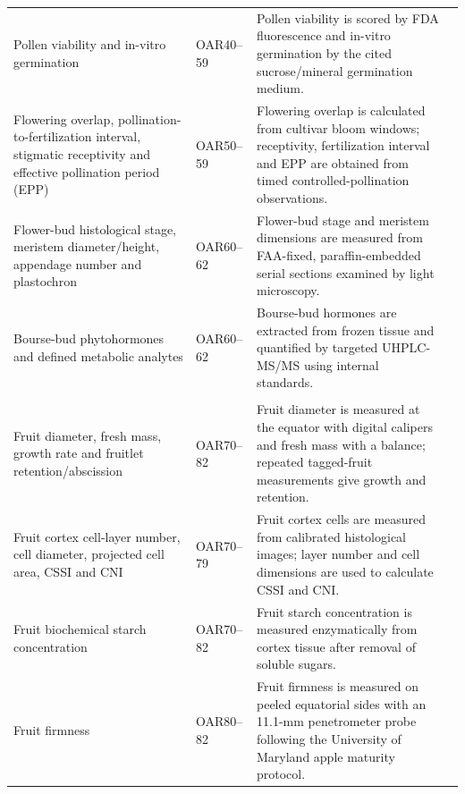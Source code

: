 \begin{landscape}
\begin{longtable}{>{\RaggedRight\arraybackslash}p{5.1cm} >{\RaggedRight\arraybackslash}p{2.3cm} >{\RaggedRight\arraybackslash}p{16.7cm} >{\RaggedRight\arraybackslash}p{2.4cm}}
Pollen viability and in-vitro germination &
OAR40--59 &
Pollen viability is scored by FDA fluorescence and in-vitro germination by the cited sucrose/mineral germination medium. &
\citep{calic2021}\\

Flowering overlap, pollination-to-fertilization interval, stigmatic receptivity and effective pollination period (EPP) &
OAR50--59 &
Flowering overlap is calculated from cultivar bloom windows; receptivity, fertilization interval and EPP are obtained from timed controlled-pollination observations. &
\citep{losada2013,roeder2021}\\

Flower-bud histological stage, meristem diameter/height, appendage number and plastochron &
OAR60--62 &
Flower-bud stage and meristem dimensions are measured from FAA-fixed, paraffin-embedded serial sections examined by light microscopy. &
\citep{kofler2019,foster2003}\\

Bourse-bud phytohormones and defined metabolic analytes &
OAR60--62 &
Bourse-bud hormones are extracted from frozen tissue and quantified by targeted UHPLC-MS/MS using internal standards. &
\citep{milyaev2022}\\

\multicolumn{4}{l}{\textbf{Fruit growth, maturity and quality}}\\
Fruit diameter, fresh mass, growth rate and fruitlet retention/abscission &
OAR70--82 &
Fruit diameter is measured at the equator with digital calipers and fresh mass with a balance; repeated tagged-fruit measurements give growth and retention. &
\citep{malladi2010,greene2013}\\

Fruit cortex cell-layer number, cell diameter, projected cell area, CSSI and CNI &
OAR70--79 &
Fruit cortex cells are measured from calibrated histological images; layer number and cell dimensions are used to calculate CSSI and CNI. &
\citep{malladi2010,ng2013}\\

Fruit biochemical starch concentration &
OAR70--82 &
Fruit starch concentration is measured enzymatically from cortex tissue after removal of soluble sugars. &
\citep{ng2013}\\

Fruit firmness &
OAR80--82 &
Fruit firmness is measured on peeled equatorial sides with an 11.1-mm penetrometer probe following the University of Maryland apple maturity protocol. &
\citep{umd_apple_maturity}\\


\end{longtable}
\end{landscape}
